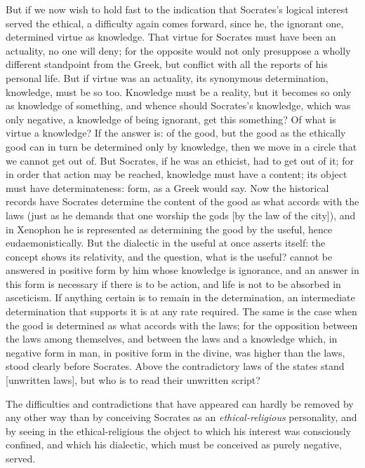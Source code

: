 But if we now wish to hold fast to the indication that Socrates's logical interest served the ethical, a difficulty
again comes forward, since he, the ignorant one, determined
virtue as knowledge. That virtue for Socrates must have been an
actuality, no one will deny; for the opposite would not only
presuppose a wholly different standpoint from the Greek, but
conflict with all the reports of his personal life. But if
virtue was an actuality, its synonymous determination, knowledge, must be so too. Knowledge must be a reality, but
it becomes so only as knowledge of something, and whence should
Socrates's knowledge, which was only negative, a knowledge of being
ignorant, get this something? Of what is virtue a knowledge?
If the answer is: of the good, but the good as the ethically
good can in turn be determined only by knowledge, then we move
in a circle that we cannot get out of. But Socrates, if he was an ethicist, had to get out of it; for in order that
action may be reached, knowledge must have a content; its
object must have determinateness: form, as a Greek would
say. Now the historical records have Socrates determine
the content of the good as what accords with the laws
(just as he demands that one worship the gods  [by the law of the city]),
and in Xenophon he is represented as determining the good
by the useful, hence eudaemonistically. But the dialectic in
the useful at once asserts itself: the concept shows its relativity, and the question, what is the useful? cannot be answered in positive form by him whose knowledge is ignorance, and an
answer in this form is necessary if there is to be action,
and life is not to be absorbed in asceticism. If anything
certain is to remain in the determination, an intermediate determination that supports it is at any rate required. The same is the case when
the good is determined as what accords with the laws;
for the opposition between the laws among themselves, and between the laws and a knowledge which, in negative form in man, in positive form
in the divine, was higher than the laws, stood clearly before
Socrates. Above the contradictory laws of the states stand  [unwritten laws],
but who is to read their unwritten script?

The difficulties and contradictions that have appeared can
hardly be removed by any other way than by conceiving Socrates
as an \emph{ethical-religious} personality, and by seeing in the ethical-religious the object to which his interest was
consciously confined, and which his dialectic, which must be conceived as purely negative, served.

